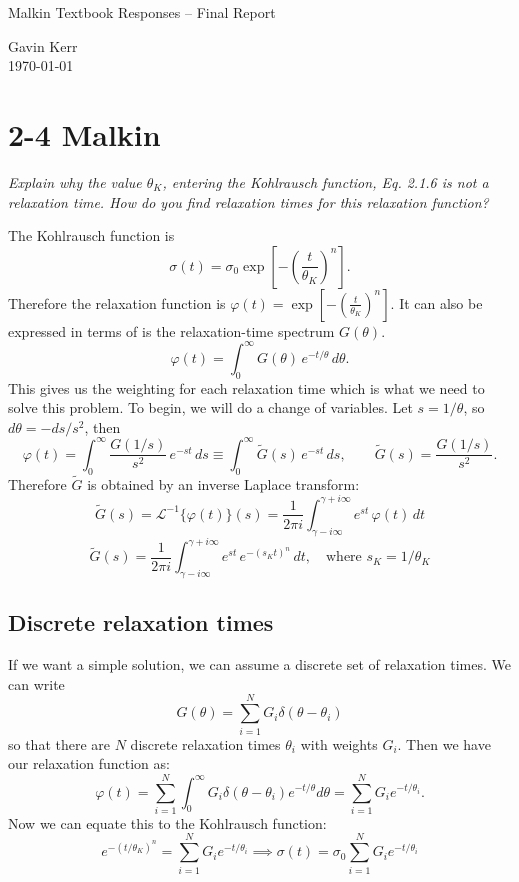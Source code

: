 \documentclass[12pt, a4paper]{article}
\numberwithin{equation}{section}
\begin{document}
{
	\LARGE Malkin Textbook Responses -- Final Report
}

{
	Gavin Kerr\\
	\today
}

\section{2-4 Malkin}
\textit{Explain why the value $\theta_K$, entering the Kohlrausch function, Eq. 2.1.6 is not a relaxation time. How do you find relaxation times for this relaxation function?}

The Kohlrausch function is
\[
	\sigma(t) = \sigma_0 \exp\!\left[-\left(\frac{t}{\theta_K}\right)^n\right].
\]
Therefore the relaxation function is
$\varphi(t)=\exp\!\left[-\left(\frac{t}{\theta_K}\right)^n\right]$.
It can also be expressed in terms of is the relaxation-time spectrum $G(\theta)$.
\begin{equation}
	\varphi(t)=\int_0^\infty G(\theta)\,e^{-t/\theta}\,d\theta.
	\label{eq:phi_t}
\end{equation}
This gives us the weighting for each relaxation time which is what we need to solve this problem.
To begin, we will do a change of variables.
Let $s=1/\theta$, so $d\theta=-ds/s^2$, then
\[
\varphi(t)=\int_0^\infty \frac{G(1/s)}{s^2}\,e^{-st}\,ds
\equiv \int_0^\infty \tilde G(s)\,e^{-st}\,ds,
\qquad
\tilde G(s)=\frac{G(1/s)}{s^2}.
\]
Therefore $\tilde G$ is obtained by an inverse Laplace transform:
\[
\tilde G(s)=\mathcal L^{-1}\{\varphi(t)\}(s)
=\frac{1}{2\pi i}\int_{\gamma-i\infty}^{\gamma+i\infty}
e^{st}\,\varphi(t)\,dt
\]
\[
\tilde G(s)=
\frac{1}{2\pi i}\int_{\gamma-i\infty}^{\gamma+i\infty}
e^{st}\,e^{-(s_K t)^n}\,dt, \quad \text{where } s_K=1/\theta_K
\]

\subsection{Discrete relaxation times}
If we want a simple solution, we can assume a discrete set of relaxation times.
We can write
\[
	G(\theta) = \sum_{i=1}^N G_i \delta(\theta - \theta_i)
\]
so that there are $N$ discrete relaxation times $\theta_i$ with weights $G_i$.
Then we have our relaxation function as:
\[
	\varphi(t) = \sum_{i=1}^N \int_0^\infty G_i \delta(\theta - \theta_i) e^{-t/\theta} d\theta
	= \sum_{i=1}^N G_i e^{-t/\theta_i}.
\]
Now we can equate this to the Kohlrausch function:
\[
	e^{- (t/\theta_K)^n }
	= \sum_{i=1}^N G_i e^{-t/\theta_i}
	\implies
	\sigma(t) = 
	\sigma_0 \sum_{i=1}^N G_i e^{-t/\theta_i}
\]
\end{document}
